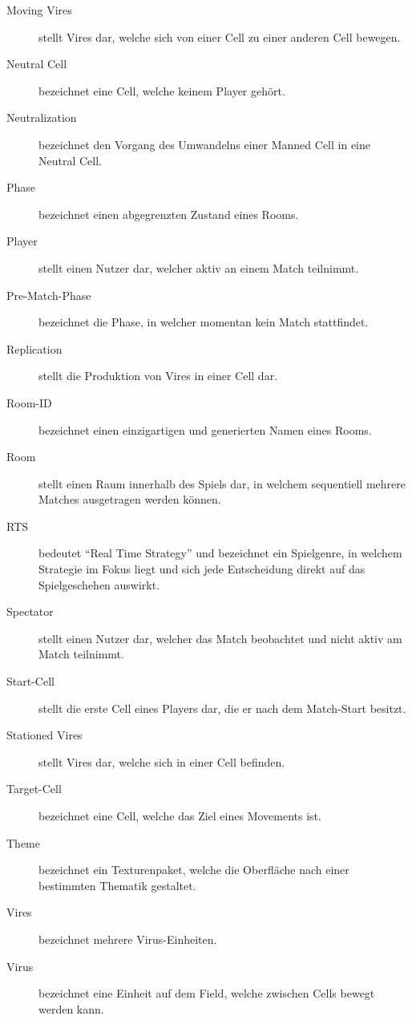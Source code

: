 \begin{description}
	\item[Moving Vires] stellt Vires dar, welche sich von einer Cell zu einer anderen Cell bewegen.
	\item[Neutral Cell] bezeichnet eine Cell, welche keinem Player gehört.
	\item[Neutralization] bezeichnet den Vorgang des Umwandelns einer Manned Cell in eine Neutral Cell.
	\item[Phase] bezeichnet einen abgegrenzten Zustand eines Rooms.
	\item[Player] stellt einen Nutzer dar, welcher aktiv an einem Match teilnimmt.
	\item[Pre-Match-Phase] bezeichnet die Phase, in welcher momentan kein Match stattfindet.
	\item[Replication] stellt die Produktion von Vires in einer Cell dar.
	\item[Room-ID] bezeichnet einen einzigartigen und generierten Namen eines Rooms.
	\item[Room] stellt einen Raum innerhalb des Spiels dar, in welchem sequentiell mehrere Matches ausgetragen werden können.
	\item[RTS] bedeutet ``Real Time Strategy'' und bezeichnet ein Spielgenre, in welchem Strategie im Fokus liegt und sich jede Entscheidung direkt auf das Spielgeschehen auswirkt.
	\item[Spectator] stellt einen Nutzer dar, welcher das Match beobachtet und nicht aktiv am Match teilnimmt.
	\item[Start-Cell] stellt die erste Cell eines Players dar, die er nach dem Match-Start besitzt.
	\item[Stationed Vires] stellt Vires dar, welche sich in einer Cell befinden.
	\item[Target-Cell] bezeichnet eine Cell, welche das Ziel eines Movements ist.
	\item[Theme] bezeichnet ein Texturenpaket, welche die Oberfläche nach einer bestimmten Thematik gestaltet.
	\item[Vires] bezeichnet mehrere Virus-Einheiten.
	\item[Virus] bezeichnet eine Einheit auf dem Field, welche zwischen Cells bewegt werden kann.
\end{description}